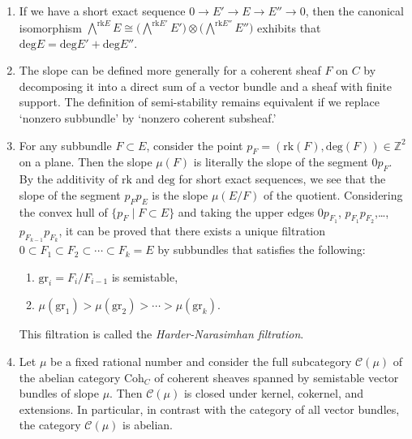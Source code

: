 \begin{remark}
\label{remark-filtration}
\begin{enumerate}
\item If we have a short exact sequence $0\to E'\to E\to E''\to 0$, then the canonical isomorphism $\bigwedge^{\mathrm{rk} E} E\cong \bigl(\bigwedge^{\mathrm{rk} E'} E'\bigr)\otimes \bigl(\bigwedge^{\mathrm{rk} E''} E''\bigr)$ exhibits that $\mathrm{deg} E = \mathrm{deg} E'+\mathrm{deg} E''$.
\item The slope can be defined more generally for a coherent sheaf $F$ on $C$ by decomposing it into a direct sum of a vector bundle and a sheaf with finite support. The definition of semi-stability remains equivalent if we replace `nonzero subbundle' by `nonzero coherent subsheaf.'
\item For any subbundle $F\subset E$, consider the point $p_F = (\mathrm{rk} (F), \mathrm{deg} (F)) \in \mathbb Z^2$ on a plane. Then the slope $\mu(F)$ is literally the slope of the segment $0p_F$. By the additivity of $\mathrm{rk}$ and $\mathrm{deg}$ for short exact sequences, we see that the slope of the segment $p_Fp_E$ is the slope $\mu(E/F)$ of the quotient. Considering the convex hull of $\{p_F\mid F\subset E\}$ and taking the upper edges $0p_{F_1}$, $p_{F_1}p_{F_2}$,\ldots, $p_{F_{k-1}}p_{F_k}$, it can be proved that there exists a unique filtration $0\subset F_1\subset F_2\subset \cdots \subset F_k = E$ by subbundles that satisfies the following:
\begin{enumerate}
\item $\mathrm{gr}_i = F_i/F_{i-1}$ is semistable, 
\item $\mu(\mathrm{gr}_1)> \mu(\mathrm{gr}_2)>\cdots >\mu(\mathrm{gr}_k)$. 
\end{enumerate}
This filtration is called the {\it Harder-Narasimhan filtration}. 
\item %
Let $\mu$ be a fixed rational number and consider the full subcategory $\mathcal C(\mu)$ of the abelian category $\mathrm{Coh}_C$ of coherent sheaves spanned by semistable vector bundles of slope $\mu$. Then $\mathcal C(\mu)$ is closed under kernel, cokernel, and extensions. In particular, in contrast with the category of all vector bundles, the category $\mathcal C(\mu)$ is abelian. 
\end{enumerate}
\end{remark}

